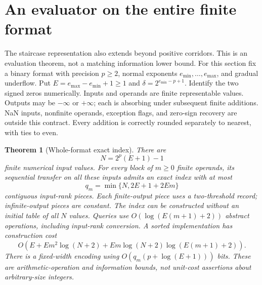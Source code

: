 \documentclass[11pt,reqno]{amsart}
\newtheorem{theorem}{Theorem}[section]
\theoremstyle{definition}
\theoremstyle{remark}
\numberwithin{equation}{section}
\begin{document}
\section{An evaluator on the entire finite format}
\label{sec:full-format}

The staircase representation also extends beyond positive corridors.
This is an evaluation theorem, not a matching information lower bound.
For this section fix a binary format with precision $p\geq2$, normal
exponents $e_{\min},\ldots,e_{\max}$, and gradual underflow. Put
$E=e_{\max}-e_{\min}+1\geq1$ and
$\delta=2^{e_{\min}-p+1}$. Identify the two signed zeros numerically.
Inputs and operands are finite representable values. Outputs may be
$-\infty$ or $+\infty$; each is absorbing under subsequent finite additions.
NaN inputs, nonfinite operands, exception flags, and zero-sign recovery
are outside this contract. Every addition is correctly rounded separately
to nearest, with ties to even.

\begin{samepage}
\begin{theorem}[Whole-format exact index]\label{thm:full-format}
There are
\[
 N=2^p(E+1)-1
\]
finite numerical input values. For every block of $m\geq0$ finite operands,
its sequential transfer on all these inputs admits an exact index with
at most
\begin{equation}\label{eq:full-piece-bound}
 q_m=\min\{N,2E+1+2Em\}
\end{equation}
contiguous input-rank pieces. Each finite-output piece uses a two-threshold
record; infinite-output pieces are constant. The index can be constructed
without an initial table of all $N$ values. Queries use
$O(\log(E(m+1)+2))$ abstract operations, including input-rank conversion.
A sorted implementation has construction cost
\begin{equation}\label{eq:full-build-bound}
 O\!\left(E+Em^2\log(N+2)
       +Em\log(N+2)\log(E(m+1)+2)\right).
\end{equation}
There is a fixed-width encoding using
$O(q_m(p+\log(E+1)))$ bits. These are arithmetic-operation and information
bounds, not unit-cost assertions about arbitrary-size integers.
\end{theorem}
\end{samepage}
\end{document}
